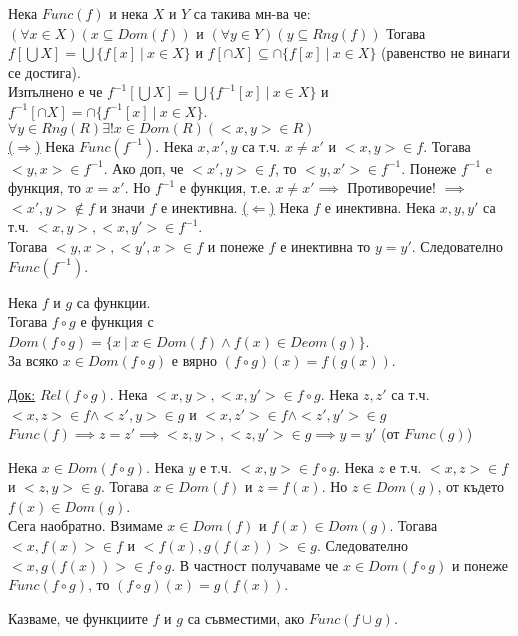 \documentclass[fleqn, titlepage, 12pt]{report}
\begin{document}
 Нека $Func(f)$ и нека $X$ и $Y$ са такива мн-ва че:\\
$(\forall{x \in X})(x \subseteq Dom(f))$ и $(\forall{y \in Y})(y \subseteq Rng(f))$
\bigbreak
Тогава $f[\bigcup X ] = \bigcup \{f[x]\ |\ x \in X\}$
и $f[\cap X ] \subseteq \cap \{f[x]\ |\ x \in X\}$ (равенство не винаги се достига).\\
Изпълнено е че $f ^{-1}[\bigcup X] = \bigcup \{f ^{-1} [x]\ |\ x \in X\}$
и $f ^{-1}[\cap X] = \cap \{f ^{-1} [x]\ |\ x \in X\}$.\\
$\forall{y \in Rng(R)\exists{!x \in Dom(R)(<x,y> \in R)}}$\\

\underline{($\Rightarrow$)} Нека $Func(f ^{-1})$. Нека $x, x',y$ са т.ч. $x \neq x'$ и $<x,y> \in f$.
Тогава $<y,x> \in f ^{-1}$. Ако доп, че $<x',y> \in f$, то $<y,x'> \in f ^{-1}$. Понеже $f ^{-1}$ e функция, то $x = x'$.
Но $f ^{-1}$ е функция, т.е. $x \neq x' \implies$ Противоречие! $\implies$ $<x',y> \notin f$ и значи $f$ е инективна.
\bigbreak
\underline{($\Leftarrow$)} Нека $f$ е инективна. Нека $x,y,y'$ са т.ч. $<x,y>, <x,y'> \in f ^{-1}$.\\
Тогава $<y,x>, <y',x> \in f$ и понеже $f$ е инективна то $y = y'$. Следователно $Func(f ^{-1})$.
\bigbreak

 Нека $f$ и $g$ са функции.\\
Тогава $f \circ g$ е функция с $Dom(f \circ g) = \{x\ |\ x \in Dom(f) \land f(x) \in Deom(g)\}$.\\
За всяко $x \in Dom(f \circ g)$ е вярно $ (f \circ g)(x) = f(g(x))$.
\bigbreak

\underline{Док:} $Rel(f \circ g)$. Нека $<x,y>, <x,y'> \in f \circ g$.
Нека $z,z'$ са т.ч. $<x,z> \in f \land <z',y> \in g$ и $<x,z'> \in f \land <z',y'> \in g$\\
$Func(f) \implies z = z' \implies <z,y>, <z,y'> \in g \implies y = y'$ (от $Func(g)$)
\bigbreak

Нека $x \in Dom(f \circ g)$. Нека $y$ е т.ч. $<x,y> \in f \circ g$. Нека $z$ е т.ч. $<x,z> \in f$ и $<z,y> \in g$.
Тогава $x \in Dom(f)$ и $z = f(x)$. Но $z \in Dom(g)$, от където $f(x) \in Dom(g)$.\\
Сега наобратно. Взимаме $x \in Dom(f)$ и $f(x) \in Dom(g)$. Тогава $<x,f(x)> \in f$ и $<f(x), g(f(x))> \in g$.
Следователно $<x,g(f(x))> \in f \circ g$. В частност получаваме че $x \in Dom(f \circ g)$ и понеже $Func(f \circ g)$,
то $(f \circ g)(x) = g(f(x))$.
\bigbreak

 Казваме, че функциите $f$ и $g$ са съвместими, ако $Func(f \cup g)$.
\bigbreak
\end{document}
